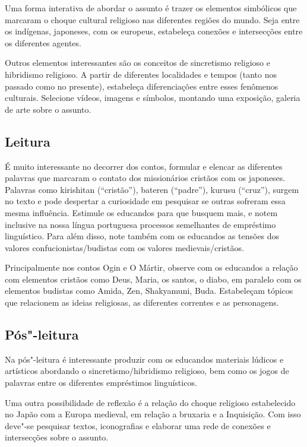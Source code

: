 \documentclass[12pt]{extarticle}
\begin{document}
Uma forma interativa de abordar o assunto é trazer os elementos
simbólicos que marcaram o choque cultural religioso nas diferentes
regiões do mundo. Seja entre os indígenas, japoneses, com os europeus,
estabeleça conexões e intersecções entre os diferentes agentes.

Outros elementos interessantes são os conceitos de sincretismo religioso
e hibridismo religioso. A partir de diferentes localidades e tempos
(tanto nos passado como no presente), estabeleça diferenciações entre
esses fenômenos culturais. Selecione vídeos, imagens e símbolos,
montando uma exposição, galeria de arte sobre o assunto.

\subsection{Leitura}

É muito interessante no decorrer dos contos, formular e
elencar as diferentes palavras que marcaram o contato dos missionários
cristãos com os japoneses. Palavras como kirishitan (``cristão''),
bateren (``padre''), kurusu (``cruz''), surgem no texto e pode despertar
a curiosidade em pesquisar se outras sofreram essa mesma influência.
Estimule os educandos para que busquem mais, e notem inclusive na nossa
língua portuguesa processos semelhantes de empréstimo linguístico. Para
além disso, note também com os educandos as tensões dos valores
confucionistas/budistas com os valores medievais/cristãos.

Principalmente nos contos Ogin e O Mártir, observe com os educandos a
relação com elementos cristãos como Deus, Maria, os santos, o diabo, em
paralelo com os elementos budistas como Amida, Zen, Shakyamuni, Buda.
Estabeleçam tópicos que relacionem as ideias religiosas, as diferentes
correntes e as personagens.


\subsection{Pós"-leitura}

Na pós"-leitura é interessante produzir com os educandos
materiais lúdicos e artísticos abordando o sincretismo/hibridismo
religioso, bem como os jogos de palavras entre os diferentes empréstimos
linguísticos.

Uma outra possibilidade de reflexão é a relação do choque religioso
estabelecido no Japão com a Europa medieval, em relação a bruxaria e a
Inquisição. Com isso deve"-se pesquisar textos, iconografias e elaborar
uma rede de conexões e intersecções sobre o assunto.
\end{document}
